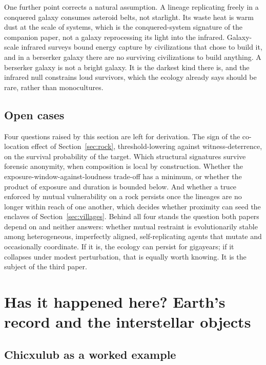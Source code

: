\documentclass[preprint,12pt]{elsarticle}
\theoremstyle{definition}
\begin{document}
One further point corrects a natural assumption. A lineage replicating freely in a conquered galaxy consumes asteroid belts, not starlight. Its waste heat is warm dust at the scale of systems, which is the conquered-system signature of the companion paper, not a galaxy reprocessing its light into the infrared. Galaxy-scale infrared surveys \citep{Griffith2015} bound energy capture by civilizations that chose to build it, and in a berserker galaxy there are no surviving civilizations to build anything. A berserker galaxy is not a bright galaxy. It is the darkest kind there is, and the infrared null constrains loud survivors, which the ecology already says should be rare, rather than monocultures.

\subsection{Open cases}
Four questions raised by this section are left for derivation. The sign of the co-location effect of Section~\ref{sec:rock}, threshold-lowering against witness-deterrence, on the survival probability of the target. Which structural signatures survive forensic anonymity, when composition is local by construction. Whether the exposure-window-against-loudness trade-off has a minimum, or whether the product of exposure and duration is bounded below. And whether a truce enforced by mutual vulnerability on a rock persists once the lineages are no longer within reach of one another, which decides whether proximity can seed the enclaves of Section~\ref{sec:villages}. Behind all four stands the question both papers depend on and neither answers: whether mutual restraint is evolutionarily stable among heterogeneous, imperfectly aligned, self-replicating agents that mutate and occasionally coordinate. If it is, the ecology can persist for gigayears; if it collapses under modest perturbation, that is equally worth knowing. It is the subject of the third paper.

\section{Has it happened here? Earth's record and the interstellar objects}
\label{sec:record}

\subsection{Chicxulub as a worked example}
\label{sec:chicxulub}
\end{document}
